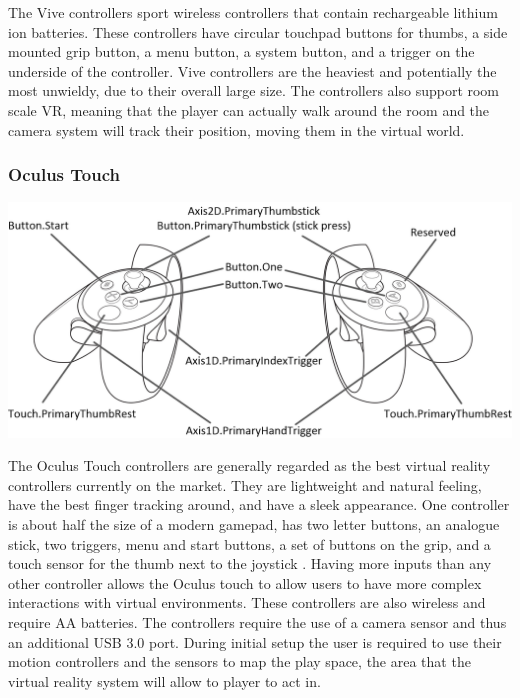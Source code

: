 \documentclass[onecolumn, draftclsnofoot,10pt, compsoc]{IEEEtran}
\begin{document}
The Vive controllers sport wireless controllers that contain rechargeable lithium ion batteries. These controllers have circular touchpad buttons for thumbs, a side mounted grip button, a menu button, a system button, and a trigger on the underside of the controller. Vive controllers are the heaviest and potentially the most unwieldy, due to their overall large size. The controllers also support room scale VR, meaning that the player can actually walk around the room and the camera system will track their position, moving them in the virtual world. 

\subsubsection{Oculus Touch}
\begin{center}
\includegraphics[scale=.30]{oculusController.png}
\end{center}

The Oculus Touch controllers are generally regarded as the best virtual reality controllers currently on the market. They are lightweight and natural feeling, have the best finger tracking around, and have a sleek appearance. One controller is about half the size of a modern gamepad, has two letter buttons, an analogue stick, two triggers, menu and start buttons, a set of buttons on the grip, and a touch sensor for the thumb next to the joystick \cite{controllerCompare}. Having more inputs than any other controller allows the Oculus touch to allow users to have more complex interactions with virtual environments. These controllers are also wireless and require AA batteries. The controllers require the use of a camera sensor and thus an additional USB 3.0 port. During initial setup the user is required to use their motion controllers and the sensors to map the play space, the area that the virtual reality system will allow to player to act in. 

\end{document}

